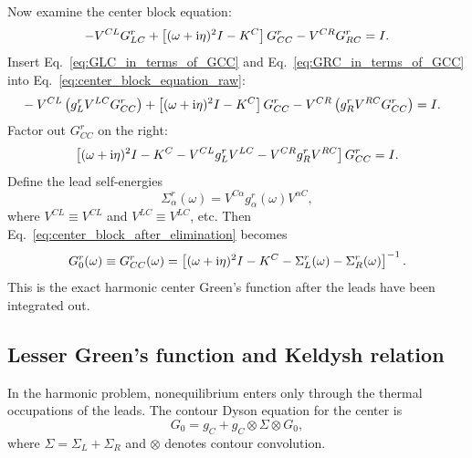 Now examine the center block equation:
\begin{equation}
    -V^{CL}G_{LC}^r + \left[ (\omega+\mathrm{i}\eta)^2I - K^C \right]G_{CC}^r - V^{CR}G_{RC}^r = I.
    \label{eq:center_block_equation_raw}
\end{equation}
Insert Eq.~\eqref{eq:GLC_in_terms_of_GCC} and Eq.~\eqref{eq:GRC_in_terms_of_GCC} into Eq.~\eqref{eq:center_block_equation_raw}:
\begin{align}
    &-V^{CL}\left( g_L^r V^{LC}G_{CC}^r \right) + \left[ (\omega+\mathrm{i}\eta)^2I - K^C \right]G_{CC}^r - V^{CR}\left( g_R^r V^{RC}G_{CC}^r \right) = I.
\end{align}
Factor out $G_{CC}^r$ on the right:
\begin{equation}
    \left[ (\omega+\mathrm{i}\eta)^2I - K^C - V^{CL}g_L^rV^{LC} - V^{CR}g_R^rV^{RC} \right]G_{CC}^r = I.
    \label{eq:center_block_after_elimination}
\end{equation}
Define the lead self-energies
\begin{equation}
    \Sigma_\alpha^r(\omega) = V^{C\alpha}g_\alpha^r(\omega)V^{\alpha C},
    \label{eq:lead_self_energy_definition}
\end{equation}
where $V^{CL} \equiv V^{C L}$ and $V^{LC} \equiv V^{L C}$, etc. Then Eq.~\eqref{eq:center_block_after_elimination} becomes
\begin{equation}
    G_0^r(\omega) \equiv G_{CC}^r(\omega)
    = \left[ (\omega+\mathrm{i}\eta)^2I - K^C - \Sigma_L^r(\omega) - \Sigma_R^r(\omega) \right]^{-1}.
    \label{eq:G0r}
\end{equation}
This is the exact harmonic center Green's function after the leads have been integrated out.

\subsection{Lesser Green's function and Keldysh relation}
In the harmonic problem, nonequilibrium enters only through the thermal occupations of the leads. The contour Dyson equation for the center is
\begin{equation}
    G_0 = g_C + g_C \otimes \Sigma \otimes G_0,
    \label{eq:contour_dyson_harmonic_center}
\end{equation}
where $\Sigma = \Sigma_L + \Sigma_R$ and $\otimes$ denotes contour convolution.

